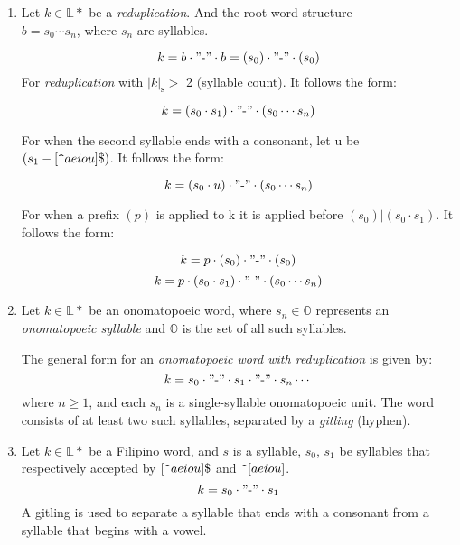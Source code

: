 \begin{enumerate}
    \item
          Let \(k \in \mathbb{L}*\) be a \textit{reduplication}. And the root word structure
          \\ \(b = s_0\cdots s_n\), where \(s_n\) are syllables.

          \[
              k = b \cdot "\text{-}" \cdot b = (s_0) \cdot "\text{-}" \cdot (s_0)
          \]
          For \textit{reduplication} with $|k|_{\text{s}}>$ 2 (syllable count). It follows the form:

          \[
              k = (s_0 \cdot s_1) \cdot "\text{-}" \cdot (s_0 \cdots s_n)
          \]

          For when the second syllable ends with a consonant, let u be\\
          \((s_1-[\verb|^|aeiou]\$)\). It follows the form:

          \[
              k = (s_0 \cdot u) \cdot "\text{-}" \cdot (s_0 \cdots s_n)
          \]

          For when a prefix \((p)\) is applied to k it is applied before \((s_0) | (s_0 \cdot s_1)\). It follows the form:

          \[
              k = p \cdot (s_0) \cdot "\text{-}" \cdot (s_0)
          \]
          \[
              k = p \cdot (s_0 \cdot s_1) \cdot "\text{-}" \cdot (s_0 \cdots s_n)
          \]
    \item
          Let \( k \in \mathbb{L}* \) be an onomatopoeic word, where \( s_n \in \mathbb{O} \) represents an \textit{onomatopoeic syllable} and \( \mathbb{O} \) is the set of all such syllables.

          The general form for an \textit{onomatopoeic word with reduplication} is given by:
          \[
              k = s_0 \cdot "\text{-}" \cdot s_1 \cdot "\text{-}" \cdot s_n \cdots
          \]
          where \( n \geq 1 \), and each \( s_n \) is a single-syllable onomatopoeic unit. The word consists of at least two such syllables, separated by a \textit{gitling} (hyphen).

    \item
          Let \(k \in \mathbb{L}*\) be a Filipino word, and $s$ is a syllable, $s_0$, $s_1$ be syllables that respectively accepted by \([\verb|^|aeiou]\$\) and \(\verb|^|[aeiou]\).
          \[
              k = s_0 \cdot "\text{-}" \cdot s_1
          \]
          A gitling is used to separate a syllable that ends with a consonant from a syllable that begins with a vowel.\\


\end{enumerate}
